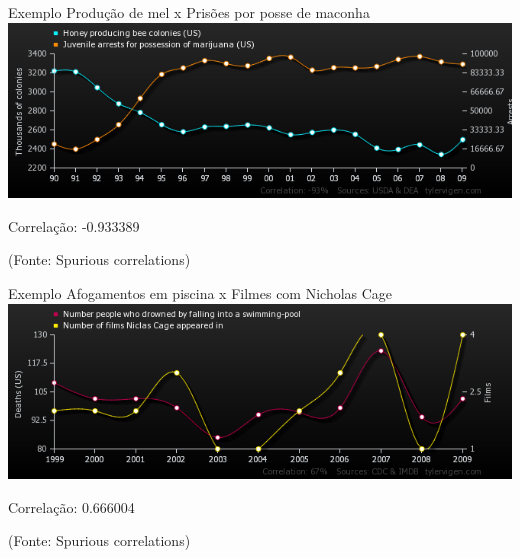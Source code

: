 \documentclass{beamer}
\begin{document}
\begin{frame}{Exemplo}
  Produção de mel x Prisões por posse de maconha
  \includegraphics[width=\textwidth]{Cap17/honey-producing-bee-colonies-us_juvenile-arrests-for-possession-of-marijuana-us}

  Correlação: -0.933389

  (Fonte: Spurious correlations)
\end{frame}

\begin{frame}{Exemplo}
  Afogamentos em piscina x Filmes com Nicholas Cage
  \includegraphics[width=\textwidth]{Cap17/number-people-who-drowned-by-falling-into-a-swimming-pool_number-of-films-niclas-cage-appeared-in}

  Correlação: 0.666004

  (Fonte: Spurious correlations)
\end{frame}

\end{document}
